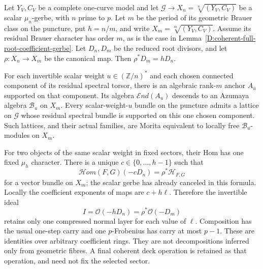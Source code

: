 \begin{proposition}
\label{D:single-sector-root-compression}
Let $Y_V,C_V$ be a complete one-curve model and let
$\mathscr G\to X_n=\sqrt[n]{(Y_V,C_V)}$ be a scalar
$\mu_n$-gerbe, with $n$ prime to $p$. Let $m$ be the
period of its geometric Brauer class on the puncture,
put $h=n/m$, and write $X_m=\sqrt[m]{(Y_V,C_V)}$.
Assume its residual Brauer character has order $m$,
as is the case in Lemma~\ref{D:coherent-full-root-coefficient-gerbe}.
Let $D_n,D_m$ be the reduced root divisors, and let
$\rho:X_n\to X_m$ be the canonical map. Then
$\rho^*D_m=hD_n$.

For each invertible scalar weight $u\in(\mathbb Z/n)^*$
and each chosen connected component of its residual
spectral torsor, there is an algebraic rank-$m$ anchor
$A_u$ supported on that component. Its algebra
$\mathcal End(A_u)$ descends to an Azumaya algebra
$\mathcal B_u$ on $X_m$. Every scalar-weight-$u$
bundle on the puncture admits a lattice on $\mathscr G$
whose residual spectral bundle is supported on this
one chosen component. Such lattices, and their actual
families, are Morita equivalent to locally free
$\mathcal B_u$-modules on $X_m$.

For two objects of the same scalar weight in fixed
sectors, their Hom has one fixed $\mu_h$ character.
There is a unique $c\in\{0,\ldots,h-1\}$ such that
\[
 \mathcal Hom(F,G)(-cD_n)=\rho^*\mathcal H_{F,G}
                                                        \tag{D.SC.3}
\]
for a vector bundle on $X_m$; the scalar gerbe has
already canceled in this formula. Locally the coefficient
exponents of maps are $c+h\ell$. Therefore the invertible
ideal
\[
                  I=\mathcal O(-hD_n)=\rho^*\mathcal O(-D_m)
                                                        \tag{D.SC.4}
\]
retains only one compressed normal layer for each value
of $\ell$. Composition has the usual one-step carry
and one $p$-Frobenius has carry at most $p-1$.
These are identities over arbitrary coefficient rings.
They are not decompositions inferred only from geometric
fibres. A final coherent deck operation is retained as
that operation, and need not fix the selected sector.
\end{proposition}

